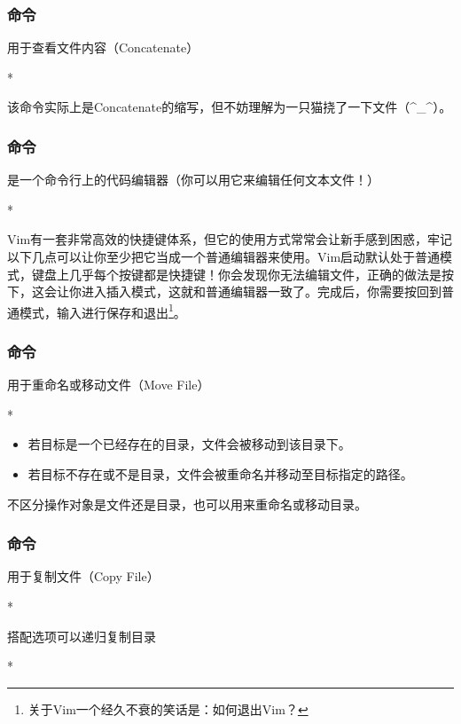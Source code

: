 \begin{frame}
    \frametitle{命令}
    用于查看文件内容（Concatenate）
    \begin{Code}*
        
    \end{Code}
    该命令实际上是Concatenate的缩写，但不妨理解为一只猫挠了一下文件（\^{}\_\^{}）。
\end{frame}

\begin{frame}
    \frametitle{命令}
    是一个命令行上的代码编辑器（你可以用它来编辑任何文本文件！）
    \begin{Code}*
        
    \end{Code}
    Vim有一套非常高效的快捷键体系，但它的使用方式常常会让新手感到困惑，牢记以下几点可以让你至少把它当成一个普通编辑器来使用。Vim启动默认处于普通模式，键盘上几乎每个按键都是快捷键！你会发现你无法编辑文件，正确的做法是按下，这会让你进入插入模式，这就和普通编辑器一致了。完成后，你需要按回到普通模式，输入进行保存和退出\footnote{关于Vim一个经久不衰的笑话是：如何退出Vim？}。
\end{frame}

\begin{frame}
    \frametitle{命令}
    用于重命名或移动文件（Move File）
    \begin{Code}*
        
    \end{Code}
    \begin{itemize}
        \item 若目标是一个已经存在的目录，文件会被移动到该目录下。
        \item 若目标不存在或不是目录，文件会被重命名并移动至目标指定的路径。
    \end{itemize}
    不区分操作对象是文件还是目录，也可以用来重命名或移动目录。
\end{frame}

\begin{frame}
    \frametitle{命令}
    用于复制文件（Copy File）
    \begin{Code}*
        
    \end{Code}
    搭配选项可以递归复制目录
    \begin{Code}*
        
    \end{Code}
\end{frame}

